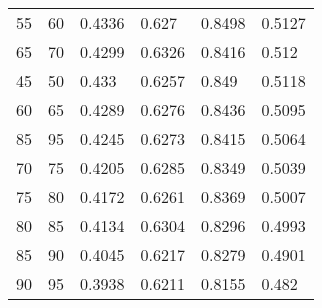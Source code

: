 \begin{center}
\begin{longtable}{|l|l|l|l|l|l|}
55 & 60 & 0.4336 & 0.627  & 0.8498 & 0.5127 \\
65 & 70 & 0.4299 & 0.6326 & 0.8416 & 0.512  \\
45 & 50 & 0.433  & 0.6257 & 0.849  & 0.5118 \\
60 & 65 & 0.4289 & 0.6276 & 0.8436 & 0.5095 \\
85 & 95 & 0.4245 & 0.6273 & 0.8415 & 0.5064 \\
70 & 75 & 0.4205 & 0.6285 & 0.8349 & 0.5039 \\
75 & 80 & 0.4172 & 0.6261 & 0.8369 & 0.5007 \\
80 & 85 & 0.4134 & 0.6304 & 0.8296 & 0.4993 \\
85 & 90 & 0.4045 & 0.6217 & 0.8279 & 0.4901 \\
90 & 95 & 0.3938 & 0.6211 & 0.8155 & 0.482
\end{longtable}

\end{center}


